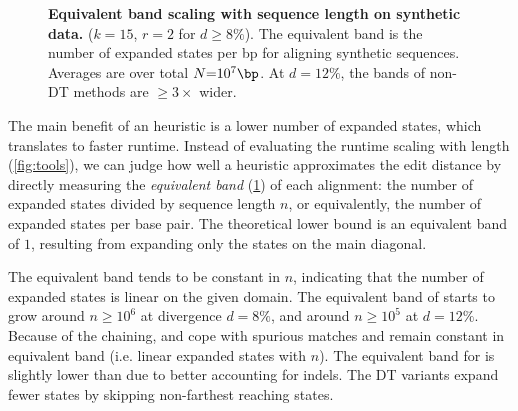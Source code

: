 \begin{figure}[H]
{  \label{fig:band10}}
  \hfill
  \caption[Band scaling with sequence length on synthetic data]{\textbf{Equivalent band scaling with sequence length on synthetic data.}
    ($k{=}15$, $r{=}2$ for $d{\geq}8\%$). The equivalent band is the number of
    expanded states per bp for aligning synthetic sequences. Averages are over
    total $N{=}10^7\bp$. At $d{=}12\%$, the bands of non-DT methods are $\geq
    3\times$ wider.}
  \label{fig:band}
\end{figure}

The main benefit of an \A heuristic is a lower number of expanded states, which
translates to faster runtime. Instead of evaluating the runtime scaling with
length (\cref{fig:tools}), we can judge how well a heuristic
approximates the edit distance by directly measuring the \emph{equivalent band}
(\cref{fig:band}) of each alignment: the number of expanded states divided by
sequence length $n$, or equivalently, the number of expanded states per base pair.
The theoretical lower bound is an equivalent band of $1$, resulting from
expanding only the states on the main diagonal.

The equivalent band tends to be constant in $n$, indicating that the number of
expanded states is linear on the given domain. The equivalent band of \SH starts
to grow around $n\geq 10^6$ at divergence $d{=}8\%$, and around $n\geq 10^5$ at
$d{=}12\%$. Because of the chaining, \CSH and \GCH cope with spurious matches
and remain constant in equivalent band (i.e. linear expanded states with $n$).
The equivalent band for \GCH is slightly lower than \CSH due to better
accounting for indels. The DT variants expand fewer states by skipping
non-farthest reaching states.
